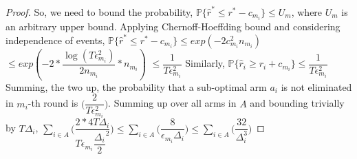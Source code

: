 \begin{proof}
	So, we need to bound the probability,
\newline\hspace*{4em} $\mathbb{P}\lbrace\hat{r}^{*}\leq r^{*} - c_{m_{i}}\rbrace\leq U_{m}$, where $U_{m}$ is an  arbitrary upper bound.
\newline
Applying Chernoff-Hoeffding bound and considering independence of events,
\newline
\newline\hspace*{0em} $\mathbb{P}\lbrace\hat{r}^{*}\leq r^{*} - c_{m_{i}}\rbrace\leq exp(-2c_{m_{i}}^{2}n_{m_{i}})$
\newline\hspace*{8em} $\leq exp(-2 * \dfrac{\log (T\epsilon_{m_{i}}^{2})}{2 n_{m_{i}}} *n_{m_{i}})$
\newline\hspace*{8em} $\leq \dfrac{1}{T\epsilon_{m_{i}}^{2}}$
\newline
Similarly, $\mathbb{P}\lbrace\hat{r}_{i}\geq r_{i} + c_{m_{i}}\rbrace\leq \dfrac{1}{T\epsilon_{m_{i}}^{2}}$
\newline
Summing, the two up, the probability that a sub-optimal arm $a_{i}$ is not eliminated in $m_{i}$-th round is  $\bigg(\dfrac{2}{T\epsilon_{m_{i}}^{2}}\bigg)$. 
\newline
Summing up over all arms in $A$ and bounding trivially by $T\Delta_{i}$,
\newline\hspace*{4em} $\sum_{i\in A}\bigg(\dfrac{2*4T\Delta_{i}}{T\epsilon_{m_{i}}\dfrac{\Delta_{i}}{2}^{2}}\bigg)\leq \sum_{i\in A}\bigg(\dfrac{8}{\epsilon_{m_{i}}\Delta_{i}}\bigg)\leq \sum_{i\in A}\bigg(\dfrac{32}{\Delta_{i}^{3}}\bigg)$



\end{proof}
